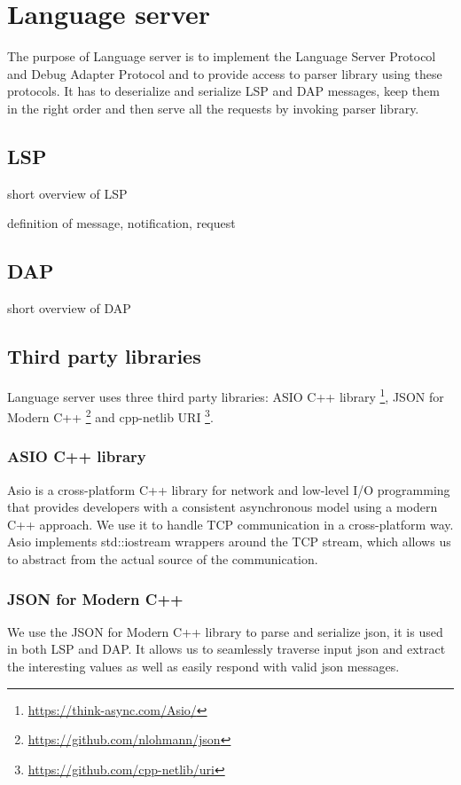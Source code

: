 \chapter{Language server}

The purpose of Language server is to implement the Language Server Protocol and Debug Adapter Protocol and to provide access to parser library using these protocols. It has to deserialize and serialize LSP and DAP messages, keep them in the right order and then serve all the requests by invoking parser library.

\section{LSP}
short overview of LSP

definition of message, notification, request
\section{DAP}
short overview of DAP

\section{Third party libraries}
Language server uses three third party libraries: ASIO C++ library \footnote{\url{https://think-async.com/Asio/}}, JSON for Modern C++ \footnote{\url{https://github.com/nlohmann/json}} and 
cpp-netlib URI \footnote{\url{https://github.com/cpp-netlib/uri}}.

\subsection{ASIO C++ library}
Asio is a cross-platform C++ library for network and low-level I/O programming that provides developers with a consistent asynchronous model using a modern C++ approach. We use it to handle TCP communication in a cross-platform way. Asio implements std::iostream wrappers around the TCP stream, which allows us to abstract from the actual source of the communication.

\subsection{JSON for Modern C++}
We use the JSON for Modern C++ library to parse and serialize json, it is used in both LSP and DAP. It allows us to seamlessly traverse input json and extract the interesting values as well as easily respond with valid json messages.

